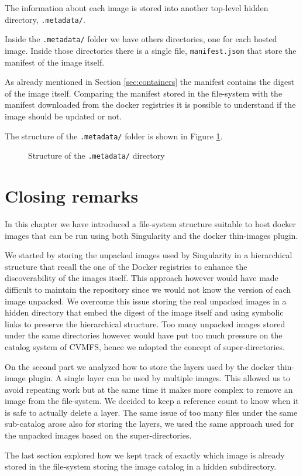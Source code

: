 The information about each image is stored into another top-level hidden
directory, \texttt{.metadata/}.

Inside the \texttt{.metadata/} folder we have others directories, one for each
hosted image.  Inside those directories there is a single file,
\texttt{manifest.json} that store the manifest of the image itself.

As already mentioned in Section \ref{sec:containers} the
manifest contains the digest of the image itself.  Comparing the manifest
stored in the file-system with the manifest downloaded from the docker
registries it is possible to understand if the image should be updated or not.

The structure of the \texttt{.metadata/} folder is shown in Figure
\ref{fig:metadata-folder-structure}.

\begin{figure}
\caption{Structure of the \texttt{.metadata/} directory}
\label{fig:metadata-folder-structure}
\end{figure}

\section{Closing remarks}

In this chapter we have introduced a file-system structure suitable to host
docker images that can be run using both Singularity and the docker thin-images
plugin.

We started by storing the unpacked images used by Singularity in a hierarchical
structure that recall the one of the Docker registries to enhance the
discoverability of the images itself. This approach however would have made
difficult to maintain the repository since we would not know the version of
each image unpacked. We overcome this issue storing the real unpacked images in
a hidden directory that embed the digest of the image itself and using symbolic
links to preserve the hierarchical structure. Too many unpacked images stored
under the same directories however would have put too much pressure on the
catalog system of CVMFS, hence we adopted the concept of super-directories.

On the second part we analyzed how to store the layers used by the docker
thin-image plugin. A single layer can be used by multiple images. This allowed
us to avoid repeating work but at the same time it makes more complex to remove
an image from the file-system. We decided to keep a reference count to know
when it is safe to actually delete a layer. The same issue of too many files
under the same sub-catalog arose also for storing the layers, we used the same
approach used for the unpacked images based on the super-directories.

The last section explored how we kept track of exactly which image is already
stored in the file-system storing the image catalog in a hidden subdirectory.
